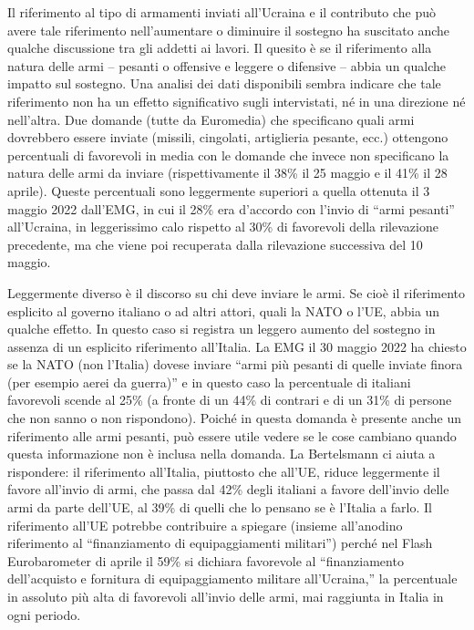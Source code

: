 \documentclass[
]{book}
\begin{document}
Il riferimento al tipo di armamenti inviati all'Ucraina e il contributo che può avere tale riferimento nell'aumentare o diminuire il sostegno ha suscitato anche qualche discussione tra gli addetti ai lavori. Il quesito è se il riferimento alla natura delle armi -- pesanti o offensive e leggere o difensive -- abbia un qualche impatto sul sostegno. Una analisi dei dati disponibili sembra indicare che tale riferimento non ha un effetto significativo sugli intervistati, né in una direzione né nell'altra. Due domande (tutte da Euromedia) che specificano quali armi dovrebbero essere inviate (missili, cingolati, artiglieria pesante, ecc.) ottengono percentuali di favorevoli in media con le domande che invece non specificano la natura delle armi da inviare (rispettivamente il 38\% il 25 maggio e il 41\% il 28 aprile). Queste percentuali sono leggermente superiori a quella ottenuta il 3 maggio 2022 dall'EMG, in cui il 28\% era d'accordo con l'invio di ``armi pesanti'' all'Ucraina, in leggerissimo calo rispetto al 30\% di favorevoli della rilevazione precedente, ma che viene poi recuperata dalla rilevazione successiva del 10 maggio.

Leggermente diverso è il discorso su chi deve inviare le armi. Se cioè il riferimento esplicito al governo italiano o ad altri attori, quali la NATO o l'UE, abbia un qualche effetto. In questo caso si registra un leggero aumento del sostegno in assenza di un esplicito riferimento all'Italia. La EMG il 30 maggio 2022 ha chiesto se la NATO (non l'Italia) dovese inviare ``armi più pesanti di quelle inviate finora (per esempio aerei da guerra)'' e in questo caso la percentuale di italiani favorevoli scende al 25\% (a fronte di un 44\% di contrari e di un 31\% di persone che non sanno o non rispondono). Poiché in questa domanda è presente anche un riferimento alle armi pesanti, può essere utile vedere se le cose cambiano quando questa informazione non è inclusa nella domanda. La Bertelsmann ci aiuta a rispondere: il riferimento all'Italia, piuttosto che all'UE, riduce leggermente il favore all'invio di armi, che passa dal 42\% degli italiani a favore dell'invio delle armi da parte dell'UE, al 39\% di quelli che lo pensano se è l'Italia a farlo. Il riferimento all'UE potrebbe contribuire a spiegare (insieme all'anodino riferimento al ``finanziamento di equipaggiamenti militari'') perché nel Flash Eurobarometer di aprile il 59\% si dichiara favorevole al ``finanziamento dell'acquisto e fornitura di equipaggiamento militare all'Ucraina,'' la percentuale in assoluto più alta di favorevoli all'invio delle armi, mai raggiunta in Italia in ogni periodo.
\end{document}
